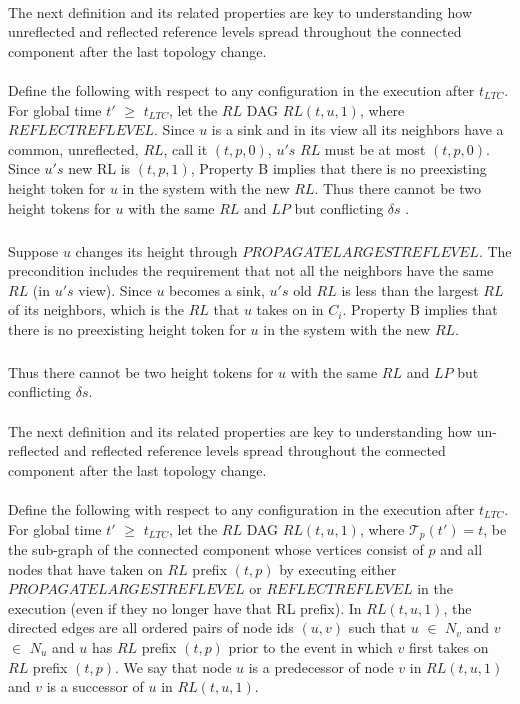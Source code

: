 \paragraph{}The next definition and its related properties are key to understanding how unreflected and reflected reference levels spread throughout the connected component after the last topology change.
\paragraph{}Define the following with respect to any configuration in the execution after $t_{LTC}$. For global time $t'$ $\geq$ $t_{LTC}$, let the $RL$ DAG $RL (t, u, 1)$, where $REFLECTREFLEVEL$. Since $u$ is a sink and in its view all its neighbors have a common, unreflected, $RL$, call it $(t, p, 0)$, $u's$ $RL$ must be at most $(t, p, 0)$. Since $u's$ new RL is $(t, p, 1)$, Property B implies that there is no preexisting height token for $u$ in the system with the new $RL$. Thus there cannot be two height tokens for $u$ with the same $RL$ and $LP$ but conflicting $\delta s$ . 
\subparagraph{}Suppose $u$ changes its height through $PROPAGATELARGESTREFLEVEL$. The precondition includes the requirement that not all the neighbors have the same $RL$ (in $u's$ view). Since $u$ becomes a sink, $u's$ old $RL$ is less than the largest $RL$ of its neighbors, which is the $RL$ that $u$ takes on in $C_i$. Property B implies that there is no preexisting height token for $u$ in the system with the new $RL$. 
\subparagraph{}Thus there cannot be two height tokens for $u$ with the same $RL$ and $LP$ but conflicting $\delta s$.

\paragraph{}The next definition and its related properties are key to understanding how un-reflected and reflected reference levels spread throughout the connected component after the last topology change.
\paragraph{}Define the following with respect to any configuration in the execution after $t_{LTC}$. For global time $t'$ $\geq$ $t_{LTC}$, let the $RL$ DAG $RL (t, u, 1)$, where $\mathcal{T}_p(t ' ) = t$, be the sub-graph of the connected component whose vertices consist of $p$ and all nodes that have taken on $RL$ prefix $(t, p)$ by executing either $PROPAGATELARGESTREFLEVEL$ or $REFLECTREFLEVEL$ in the execution (even if they no longer have that RL prefix). In $RL (t, u, 1)$, the directed edges are all ordered pairs of node ids $(u, v)$ such that $u$ $\in$ $N_v$ and $v$ $\in$ $N_u$ and $u$ has $RL$ prefix $(t, p)$ prior to the event in which $v$ first takes on $RL$ prefix $(t, p)$. We say that node $u$ is a predecessor of node $v$ in $RL (t, u, 1)$ and $v$ is a successor of $u$ in $RL (t, u, 1)$.

